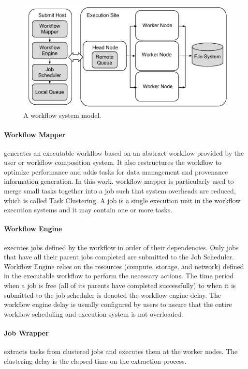 \begin{figure}[htb]
\centering
  \includegraphics[width=0.95\linewidth]{figures/model/execution.pdf}
  \caption{A workflow system model.}
  \label{fig:model_system}
  \vspace{-10pt}
\end{figure}

\paragraph{Workflow Mapper} generates an executable workflow based on an abstract workflow provided by the user or workflow composition system. It also restructures the workflow to optimize performance and adds tasks for data management and provenance information generation. In this work, workflow mapper is particularly used to merge small tasks together into a job such that system overheads are reduced, which is called Task Clustering. A job is a single execution unit in the workflow execution systems and it may contain one or more tasks.

\paragraph{Workflow Engine} executes jobs defined by the workflow in order of their dependencies. Only jobs that have all their parent jobs completed are submitted to the Job Scheduler. Workflow Engine relies on the resources (compute, storage, and network) defined in the executable workflow to perform the necessary actions. The time period when a job is free (all of its parents have completed successfully) to when it is submitted to the job scheduler is denoted the workflow engine delay. The workflow engine delay is usually configured by users to assure that the entire workflow scheduling and execution system is not overloaded. 

\paragraph{Job Wrapper} extracts tasks from clustered jobs and executes them at the worker nodes. The clustering delay is the elapsed time on the extraction process.



